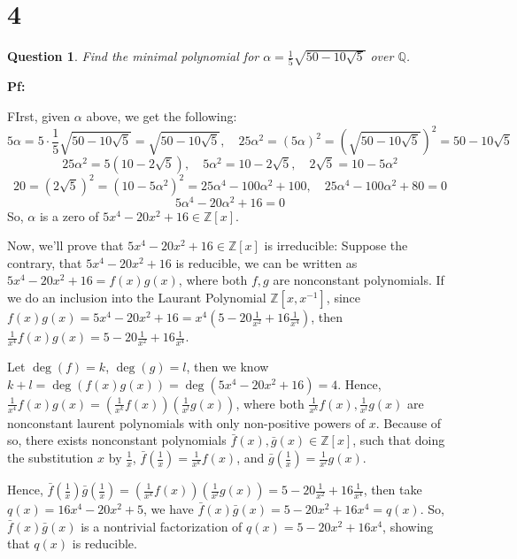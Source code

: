 \documentclass{article}
\newtheorem{question}{Question}
\begin{document}
\hfil

\hfil

\section*{4}
\begin{myBox}[]{}
    \begin{question}
        Find the minimal polynomial for $\alpha=\frac{1}{5}\sqrt{50-10\sqrt{5}}$ over $\mathbb{Q}$.
    \end{question}
\end{myBox}

\textbf{Pf:}

FIrst, given $\alpha$ above, we get the following:
$$5\alpha = 5\cdot \frac{1}{5}\sqrt{50-10\sqrt{5}}=\sqrt{50-10\sqrt{5}},\quad 25\alpha^2=(5\alpha)^2=\left(\sqrt{50-10\sqrt{5}}\right)^2=50-10\sqrt{5}$$
$$25\alpha^2=5(10-2\sqrt{5}),\quad 5\alpha^2=10-2\sqrt{5},\quad 2\sqrt{5}=10-5\alpha^2$$
$$20=(2\sqrt{5})^2=(10-5\alpha^2)^2=25\alpha^4-100\alpha^2+100,\quad 25\alpha^4-100\alpha^2+80=0$$
$$5\alpha^4-20\alpha^2+16=0$$
So, $\alpha$ is a zero of $5x^4-20x^2+16\in\mathbb{Z}[x]$.

\hfil

Now, we'll prove that $5x^4-20x^2+16\in\mathbb{Z}[x]$ is irreducible: Suppose the contrary, that $5x^4-20x^2+16$ is reducible, we can be written as $5x^4-20x^2+16=f(x)g(x)$, where both $f,g$ are nonconstant polynomials.
If we do an inclusion into the Laurant Polynomial $\mathbb{Z}[x,x^{-1}]$, since $f(x)g(x)=5x^4-20x^2+16 = x^4(5-20\frac{1}{x^2}+16\frac{1}{x^4})$,
then $\frac{1}{x^4}f(x)g(x)=5-20\frac{1}{x^2}+16\frac{1}{x^4}$.

Let $\deg(f)=k$, $\deg(g)=l$, then we know $k+l=\deg(f(x)g(x))=\deg(5x^4-20x^2+16)=4$. Hence, $\frac{1}{x^4}f(x)g(x)=\left(\frac{1}{x^k}f(x)\right)\left(\frac{1}{x^l}g(x)\right)$,  where both $\frac{1}{x^k}f(x),\frac{1}{x^l}g(x)$ are nonconstant laurent polynomials with only non-positive powers of $x$.
Because of so, there exists nonconstant polynomials $\bar{f}(x),\bar{g}(x)\in\mathbb{Z}[x]$, such that doing the substitution $x$ by $\frac{1}{x}$, $\bar{f}(\frac{1}{x})=\frac{1}{x^k}f(x)$, and $\bar{g}(\frac{1}{x})=\frac{1}{x^l}g(x)$.

Hence, $\bar{f}(\frac{1}{x})\bar{g}(\frac{1}{x})=\left(\frac{1}{x^k}f(x)\right)\left(\frac{1}{x^l}g(x)\right)=5-20\frac{1}{x^2}+16\frac{1}{x^4}$, then take $q(x)=16x^4-20x^2+5$, we have $\bar{f}(x)\bar{g}(x)=5-20x^2+16x^4=q(x)$.
So, $\bar{f}(x)\bar{g}(x)$ is a nontrivial factorization of $q(x)=5-20x^2+16x^4$, showing that $q(x)$ is reducible.
\end{document}
